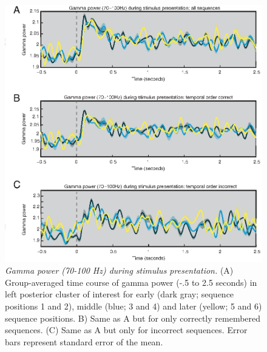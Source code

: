 \begin{figure}
  \centering
  \includegraphics[width=\textwidth]{figures/chapter3_suppfigure7.eps}
  \caption[Gamma power during stimulus presentation]{\textit{Gamma power (70-100 Hz) during stimulus presentation.} (A) Group-averaged time course of gamma power (-.5 to 2.5 seconds) in left posterior cluster of interest for early (dark gray; sequence positions 1 and 2), middle (blue; 3 and 4) and later (yellow; 5 and 6) sequence positions. B) Same as A but for only correctly remembered sequences. (C) Same as A but only for incorrect sequences.  Error bars represent standard error of the mean.}
  \label{chapter3_suppfigure7}
\end{figure}

